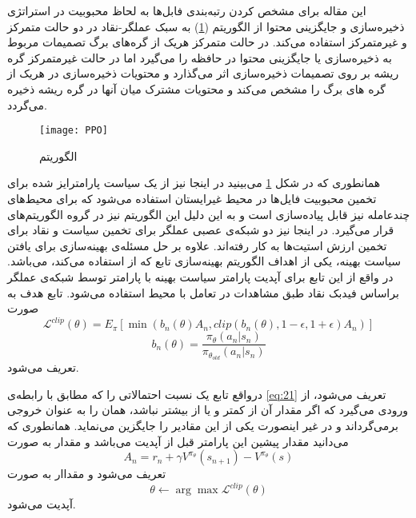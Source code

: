 این مقاله برای مشخص کردن رتبه‌بندی فابل‌ها به لحاظ محبوبیت در استراتژی ذخیره‌سازی و جایگزینی محتوا از الگوریتم  (\ref{fig:ppo}) به سبک عملگر-نقاد در دو حالت متمرکز و غیرمتمرکز استفاده می‌کند. در حالت متمرکز هریک از گره‌های برگ تصمیمات مربوط به ذخیره‌سازی یا جایگزینی محتوا در حافظه را می‌گیرد اما در حالت غیرمتمرکز گره ریشه بر روی تصمیمات ذخیره‌سازی اثر می‌گذارد و محتویات 
ذخیره‌سازی در هریک از گره های برگ را مشخص می‌کند و محتویات مشترک میان آنها در گره ریشه ذخیره می‌گردد.

\begin{figure}[ht]
	\centerline{\texttt{[image: PPO]}}
	\caption{الگوریتم }
	\label{fig:ppo}
\end{figure}

همانطوری که در شکل \ref{fig:ppo} می‌بینید در اینجا نیز از یک سیاست پارامترایز شده  برای تخمین محبوبیت فایل‌ها در محیط غیرایستان استفاده می‌شود که برای محیط‌های چندعامله نیز قابل پیاده‌سازی است و به این دلیل این الگوریتم نیز در گروه الگوریتم‌های  قرار می‌گیرد. در اینجا نیز دو شبکه‌ی عصبی عملگر برای تخمین سیاست و نقاد برای تخمین ارزش استیت‌ها  به کار رفته‌اند. علاوه بر حل مسئله‌ی بهینه‌سازی برای یافتن سیاست بهینه، یکی از اهداف الگوریتم بهینه‌سازی تابع  که از  استفاده می‌کند، می‌باشد. در واقع از این تابع برای آپدیت پارامتر سیاست بهینه با پارامتر \lr{$\theta$} توسط شبکه‌ی عملگر براساس فیدبک نقاد طبق مشاهدات در تعامل با محیط استفاده می‌شود. تابع هدف  به صورت 
\begin{equation}\label{eq:20}
	\mathcal{L}^{clip}(\theta) = E_{\pi}[\min(b_n(\theta)A_n, clip(b_n(\theta), 1 - \epsilon, 1 + \epsilon)A_n)]
\end{equation}  
\begin{equation}\label{eq:21}
	b_n(\theta) = \frac{\pi_{\theta}(a_n|s_n)}{\pi_{\theta_{old}}(a_n|s_n)}
\end{equation}  
تعریف می‌شود.

درواقع تابع  یک نسبت احتمالاتی  را که مطابق با رابطه‌ی \ref{eq:21} تعریف می‌شود، از ورودی می‌گیرد که اگر مقدار آن از  کمتر و یا از  بیشتر نباشد، همان را به عنوان خروجی برمی‌گرداند و در غیر اینصورت یکی از این مقادیر را جایگزین می‌نماید. همانطوری که می‌دانید  مقدار پیشین این پارامتر قبل از آپدیت می‌باشد و مقدار  به صورت
\begin{equation}\label{eq:20}
	A_n = r_n +‌\gamma V^{\pi_{\theta}}(s_{n+1}) - V^{\pi_{\theta}}(s)
\end{equation}  
تعریف می‌شود و مقداار \lr{$\theta$} به صورت
\begin{equation}\label{eq:20}
	\theta \leftarrow \arg\max \mathcal{L}^{clip}(\theta)
\end{equation}
آپدیت می‌شود.


